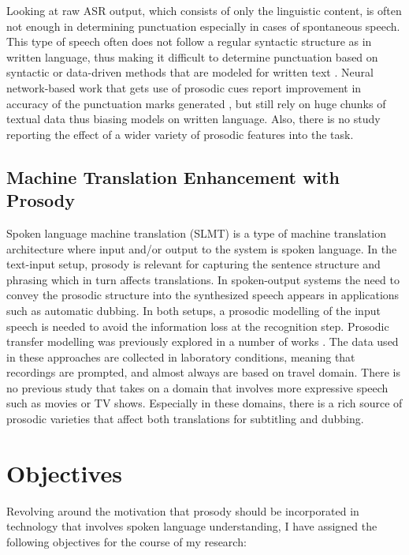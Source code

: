 Looking at raw ASR output, which consists of only the linguistic content, is often not enough in determining punctuation especially in cases of spontaneous speech. This type of speech often does not follow a regular syntactic structure as in written language, thus making it difficult to determine punctuation based on syntactic or data-driven methods that are modeled for written text \citep{ballesterosneural}. Neural network-based work that gets use of prosodic cues report improvement in accuracy of the punctuation marks generated \citep{tilk2016bidirectional}, but still rely on huge chunks of textual data thus biasing models on written language. Also, there is no study reporting the effect of a wider variety of prosodic features into the task. 

\subsection{Machine Translation Enhancement with Prosody}
Spoken language machine translation (SLMT) is a type of machine translation architecture where input and/or output to the system is spoken language. In the text-input setup, prosody is relevant for capturing the sentence structure and phrasing which in turn affects translations. In spoken-output systems the need to convey the prosodic structure into the synthesized speech appears in applications such as automatic dubbing. In both setups, a prosodic modelling of the input speech is needed to avoid the information loss at the recognition step. Prosodic transfer modelling was previously explored in a number of works \citep{aguero2006prosody, Quoc2018, anumanchipalli:2012}. The data used in these approaches are collected in laboratory conditions, meaning that recordings are prompted, and almost always are based on travel domain. There is no previous study that takes on a domain that involves more expressive speech such as movies or TV shows. Especially in these domains, there is a rich source of prosodic varieties that affect both translations for subtitling and dubbing. 

\section{Objectives}
Revolving around the motivation that prosody should be incorporated in technology that involves spoken language understanding, I have assigned the following objectives for the course of my research:


